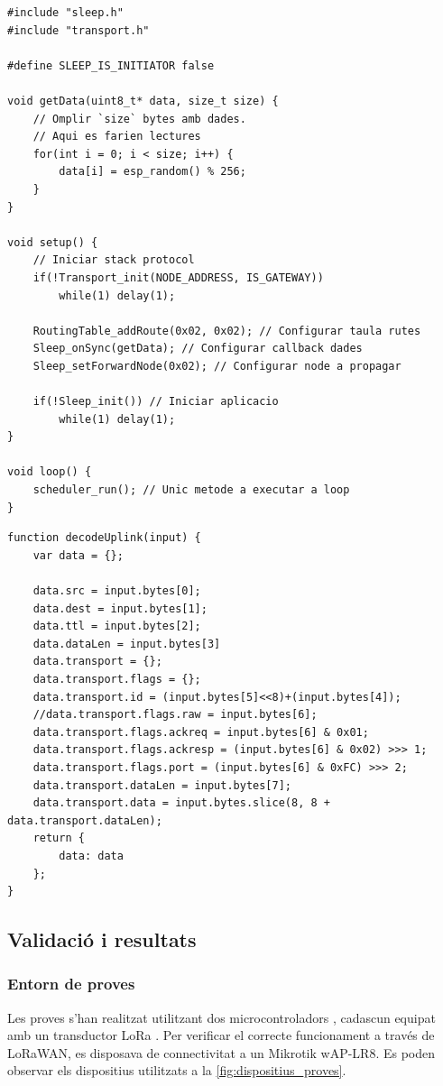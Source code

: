 \documentclass{tfgitic}[2024/07/01]
\begin{document}
{\begin{lstlisting}[style=cppStyle, caption={Exemple de funcionament mínim de l'aplicació de baix consum.}]
#include "sleep.h"
#include "transport.h"

#define SLEEP_IS_INITIATOR false

void getData(uint8_t* data, size_t size) {
    // Omplir `size` bytes amb dades.
    // Aqui es farien lectures
    for(int i = 0; i < size; i++) {
        data[i] = esp_random() % 256;
    }
}

void setup() {
    // Iniciar stack protocol
    if(!Transport_init(NODE_ADDRESS, IS_GATEWAY))
        while(1) delay(1);

    RoutingTable_addRoute(0x02, 0x02); // Configurar taula rutes
    Sleep_onSync(getData); // Configurar callback dades
    Sleep_setForwardNode(0x02); // Configurar node a propagar

    if(!Sleep_init()) // Iniciar aplicacio
        while(1) delay(1);
}

void loop() {
    scheduler_run(); // Unic metode a executar a loop
}
\end{lstlisting}

\begin{lstlisting}[style=jsStyle, caption={Exemple de descodificador de dades al servidor d'aplicació.}]
function decodeUplink(input) {
    var data = {};

    data.src = input.bytes[0];
    data.dest = input.bytes[1];
    data.ttl = input.bytes[2];
    data.dataLen = input.bytes[3]
    data.transport = {};
    data.transport.flags = {};
    data.transport.id = (input.bytes[5]<<8)+(input.bytes[4]);
    //data.transport.flags.raw = input.bytes[6];
    data.transport.flags.ackreq = input.bytes[6] & 0x01;
    data.transport.flags.ackresp = (input.bytes[6] & 0x02) >>> 1;
    data.transport.flags.port = (input.bytes[6] & 0xFC) >>> 2;
    data.transport.dataLen = input.bytes[7];
    data.transport.data = input.bytes.slice(8, 8 + data.transport.dataLen);
    return {
        data: data
    };
}
\end{lstlisting}

\subsection{Validació i resultats}
\subsubsection{Entorn de proves}
Les proves s'han realitzat utilitzant dos microcontroladors , cadascun equipat amb un transductor LoRa . Per verificar el correcte funcionament a través de LoRaWAN, es disposava de connectivitat a un  Mikrotik wAP-LR8. Es poden observar els dispositius utilitzats a la \autoref{fig:dispositius_proves}.

}
\end{document}
